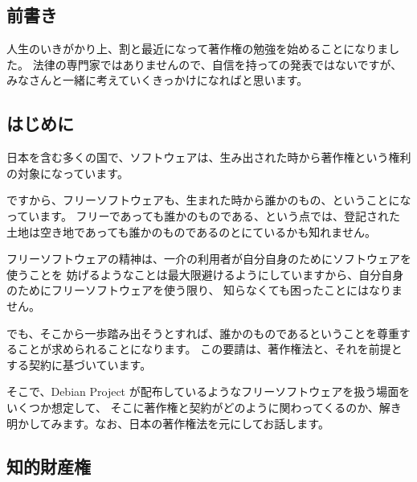 \documentclass[mingoth,a4paper]{jsarticle}
\begin{document}
\clearpage


\subsection{前書き}

人生のいきがかり上、割と最近になって著作権の勉強を始めることになりました。
法律の専門家ではありませんので、自信を持っての発表ではないですが、
みなさんと一緒に考えていくきっかけになればと思います。

\subsection{はじめに}

日本を含む多くの国で、ソフトウェアは、生み出された時から著作権という権利の対象になっています。

ですから、フリーソフトウェアも、生まれた時から誰かのもの、ということになっています。
フリーであっても誰かのものである、という点では、登記された土地は空き地であっても誰かのものであるのとにているかも知れません。

フリーソフトウェアの精神は、一介の利用者が自分自身のためにソフトウェアを使うことを
妨げるようなことは最大限避けるようにしていますから、自分自身のためにフリーソフトウェアを使う限り、
知らなくても困ったことにはなりません。

でも、そこから一歩踏み出そうとすれば、誰かのものであるということを尊重することが求められることになります。
この要請は、著作権法と、それを前提とする契約に基づいています。

そこで、Debian Project が配布しているようなフリーソフトウェアを扱う場面をいくつか想定して、
そこに著作権と契約がどのように関わってくるのか、解き明かしてみます。なお、日本の著作権法を元にしてお話します。



\subsection{知的財産権}
\end{document}
